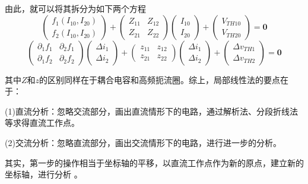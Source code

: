 \documentclass[UTF8,openany]{ctexbook}
\begin{document}
    \par 由此，就可以将其拆分为如下两个方程
    \[
    \begin{pmatrix}
        f_1(I_{10},I_{20})\\f_2(I_{10},I_{20})
    \end{pmatrix}
    +
    \begin{pmatrix}
        Z_{11} & Z_{12} \\ Z_{21} & Z_{22}
    \end{pmatrix}
    \begin{pmatrix}
        I_{10} \\ I_{20}
    \end{pmatrix}
    +
    \begin{pmatrix}
        V_{TH10} \\ V_{TH20}
    \end{pmatrix}
    =
    \textbf{0} 
    \]
    \[
        \begin{pmatrix}
            \partial_1 f_1 & \partial_2 f_1 \\
            \partial_1 f_2 & \partial_2 f_2
        \end{pmatrix}
        \begin{pmatrix}
            \Delta i_1 \\ \Delta i_2
        \end{pmatrix}    
        +
        \begin{pmatrix}
            z_{11} & z_{12} \\ z_{21} & z_{22}
        \end{pmatrix}
        \begin{pmatrix}
            \Delta i_1 \\ \Delta i_2
        \end{pmatrix}
        +
        \begin{pmatrix}
            \Delta v_{TH1} \\ \Delta v_{TH2}
        \end{pmatrix}
        =
    \textbf{0}
    \]
    \par 其中$Z$和$z$的区别同样在于耦合电容和高频扼流圈。综上，局部线性法的要点在于：
    \par (1)直流分析：忽略交流部分，画出直流情形下的电路，通过解析法、分段折线法等求得直流工作点。
    \par (2)交流分析：忽略直流部分，画出交流情形下的电路，进行进一步的分析。
    \par 其实，第一步的操作相当于坐标轴的平移，以直流工作点作为新的原点，建立新的坐标轴，进行分析 。
\end{document}

